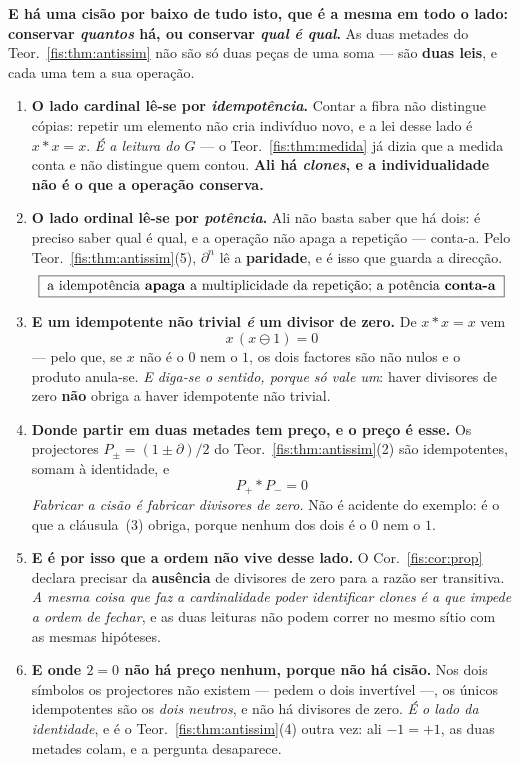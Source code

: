 \documentclass[livro.tex]{subfiles}
\begin{document}
\noindent\textbf{E há uma cisão por baixo de tudo isto, que é a mesma em todo o
lado: conservar \emph{quantos} há, ou conservar \emph{qual é qual}.} As duas
metades do Teor.~\ref{fis:thm:antissim} não são só duas peças de uma soma --- são
\textbf{duas leis}, e cada uma tem a sua operação.

\begin{teorema}\label{fis:thm:cardordem}
\begin{enumerate}\itemsep3pt
\item[(1)] \textbf{O lado cardinal lê-se por \emph{idempotência}.} Contar a fibra
não distingue cópias: repetir um elemento não cria indivíduo novo, e a lei desse
lado é $x\ast x=x$. \emph{É a leitura do $G$} --- o Teor.~\ref{fis:thm:medida} já
dizia que a medida conta e não distingue quem contou. \textbf{Ali há
\emph{clones}, e a individualidade não é o que a operação conserva.}
\item[(2)] \textbf{O lado ordinal lê-se por \emph{potência}.} Ali não basta saber
que há dois: é preciso saber qual é qual, e a operação não apaga a repetição ---
conta-a. Pelo Teor.~\ref{fis:thm:antissim}(5), $\partial^{n}$ lê a
\textbf{paridade}, e é isso que guarda a direcção.
\[
\boxed{\;\text{a idempotência \textbf{apaga} a multiplicidade da repetição; a potência \textbf{conta-a}}\;}
\]
\item[(3)] \textbf{E um idempotente não trivial \emph{é} um divisor de zero.} De
$x\ast x=x$ vem
\[
\boxed{\;x\,(x\ominus1)=0\;}
\]
--- pelo que, se $x$ não é o $0$ nem o $1$, os dois factores são não nulos e o
produto anula-se. \emph{E diga-se o sentido, porque só vale um}: haver divisores
de zero \textbf{não} obriga a haver idempotente não trivial.
\item[(4)] \textbf{Donde partir em duas metades tem preço, e o preço é esse.} Os
projectores $P_{\pm}=(1\pm\partial)/2$ do Teor.~\ref{fis:thm:antissim}(2) são
idempotentes, somam à identidade, e
\[
\boxed{\;P_{+}\ast P_{-}=0\;}
\]
\emph{Fabricar a cisão é fabricar divisores de zero.} Não é acidente do exemplo:
é o que a cláusula~(3) obriga, porque nenhum dos dois é o $0$ nem o $1$.
\item[(5)] \textbf{E é por isso que a ordem não vive desse lado.} O
Cor.~\ref{fis:cor:prop} declara precisar da \textbf{ausência} de divisores de zero
para a razão ser transitiva. \emph{A mesma coisa que faz a cardinalidade poder
identificar clones é a que impede a ordem de fechar}, e as duas leituras não
podem correr no mesmo sítio com as mesmas hipóteses.
\item[(6)] \textbf{E onde $2=0$ não há preço nenhum, porque não há cisão.} Nos
dois símbolos os projectores não existem --- pedem o dois invertível ---, os
únicos idempotentes são os \emph{dois neutros}, e não há divisores de zero.
\emph{É o lado da identidade}, e é o Teor.~\ref{fis:thm:antissim}(4) outra vez:
ali $-1=+1$, as duas metades colam, e a pergunta desaparece.
\end{enumerate}
\end{teorema}
\end{document}
